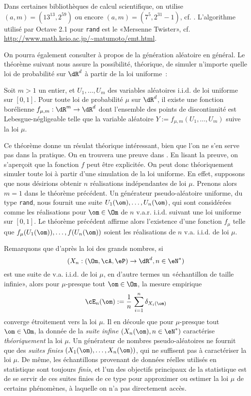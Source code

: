 Dans certaines bibliothèques de calcul
scientifique, on utilise $(a,m)=(13^{13},2^{59})$ ou encore
$(a,m)=(7^5,2^{31}-1)$, cf. \cite[page 74]{bouleau}.  L'algorithme utilisé par Octave 2.1 pour \texttt{rand} est le «Mersenne Twister», cf.
\url{http://www.math.keio.ac.jp/~matumoto/emt.html}.

On pourra également
consulter \cite{knuth-taocp-2-3} à propos de la génération aléatoire en
général. Le théorème suivant nous assure la possibilité, théorique, de simuler
n'importe quelle loi de probabilité sur $\dR^d$ à partir de la loi uniforme~:

\begin{theorem}
  Soit $m>1$ un entier, et $U_1,\ldots,U_m$ des variables aléatoires i.i.d. de loi
  uniforme sur $[0,1]$. Pour toute loi de probabilité $\mu$ sur $\dR^d$, il
  existe une fonction borélienne $f_{\mu,m}:\dR^m\to\dR^d$ dont l'ensemble des
  points de discontinuité est Lebesgue-négligeable telle que la variable
  aléatoire $Y:=f_{\mu,m}(U_1,\ldots,U_m)$ suive la loi $\mu$.
\end{theorem}

Ce théorème donne un résulat théorique intéressant, bien que l'on ne s'en
serve pas dans la pratique. On en trouvera une preuve dans \cite[chap. X page
267]{bouleau}. En lisant la preuve, on s'aperçoit que la fonction $f$ peut
être explicitée. On peut donc théoriquement simuler toute loi à partir d'une
simulation de la loi uniforme. En effet, supposons que nous désirions obtenir
$n$ réalisations indépendantes de loi $\mu$. Prenons alors $m=1$ dans le
théorème précédent. Un générateur pseudo-aléatoire uniforme, du type
\texttt{rand}, nous fournit une suite $U_1(\om),\ldots,U_n(\om)$, qui sont
considérées comme les réalisations pour $\om\in\Om$ de $n$ v.a.r. i.i.d. suivant
une loi uniforme sur $[0,1]$. Le théorème précédent affirme alors l'existence
d'une fonction $f_\mu$ telle que $f_\mu(U_1(\om)),\ldots,f(U_n(\om))$ soient les
réalisations de $n$ v.a. i.i.d. de loi $\mu$.

\begin{rem}
  Remarquons que d'après la loi des grands nombres, si
  $$(X_n:(\Om,\cA,\eP)\to\dR^d,n\in\eN^*)$$
  est une suite de v.a. i.i.d. de loi
  $\mu$, en d'autre termes un «échantillon de taille infinie»,
  alors pour $\mu$-presque tout $\om\in\Om$, la mesure empirique
  $$
  \cE_n(\om):=\frac{1}{n}\,\sum_{i=1}^n \delta_{X_i(\om)}
  $$
  converge étroitement vers la loi $\mu$. Il en découle que pour $\mu$-presque
  tout $\om\in\Om$, la donnée de la \emph{suite infine} $(X_n(\om),n\in\eN^*)$
  caractérise \emph{théoriquement} la loi $\mu$. 
  Un générateur de nombres pseudo-aléatoires ne
  fournit que des \emph{suites finies} $(X_1(\om),\ldots,X_n(\om))$, qui ne
  suffisent pas à caractériser la loi $\mu$. De même,
  les échantillons provenant de données réelles utilisés en statistique sont 
  toujours \emph{finis}, et
  l'un des objectifs principaux de la statistique est de se servir de ces
  suites finies de ce type pour approximer ou estimer la loi $\mu$ de certains
  phénomènes, à laquelle on n'a pas directement accès.
\end{rem}

